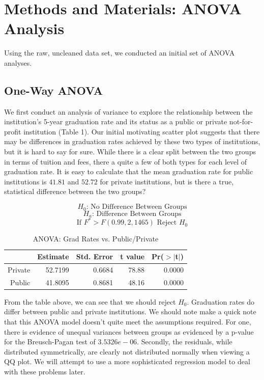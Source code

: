 \documentclass{article}
\begin{document}
\section{Methods and Materials: ANOVA Analysis}

Using the raw, uncleaned data set, we conducted an initial set of ANOVA analyses.

\subsection{One-Way ANOVA}

We first conduct an analysis of variance to explore the relationship between the institution’s 5-year graduation rate and its status as a public or private not-for-profit institution (Table 1). Our initial motivating scatter plot suggests that there may be differences in graduation rates achieved by these two types of institutions, but it is hard to say for sure. While there is a clear split between the two groups in terms of tuition and fees, there a quite a few of both types for each level of graduation rate. It is easy to calculate that the mean graduation rate for public institutions is $41.81$ and $52.72$ for private institutions, but is there a true, statistical difference between the two groups?

$$ H_0\text{: No Difference Between Groups} $$
$$ H_a\text{: Difference Between Groups} $$
$$ \text{If }F^* > F(0.99,2,1465)\text{ Reject }H_0 $$

\begin{table}[ht]
\centering
\footnotesize
\begin{tabular}{rrrrr}
  \hline
 & Estimate & Std. Error & t value & Pr($>$$|$t$|$) \\ 
  \hline
Private & 52.7199 & 0.6684 & 78.88 & 0.0000 \\ 
Public & 41.8095 & 0.8681 & 48.16 & 0.0000 \\ 
   \hline
\end{tabular}
\caption{ANOVA: Grad Rates vs. Public/Private} 
\end{table}
\FloatBarrier

From the table above, we can see that we should reject $H_0$. Graduation rates do differ between public and private institutions. We should note make a quick note that this ANOVA model doesn't quite meet the assumptions required. For one, there is evidence of unequal variances between groups as evidenced by a p-value for the Breusch-Pagan test of $3.5326e-06$. Secondly, the residuals, while distributed symmetrically, are clearly not distributed normally when viewing a QQ plot. We will attempt to use a more sophisticated regression model to deal with these problems later.
\end{document}
